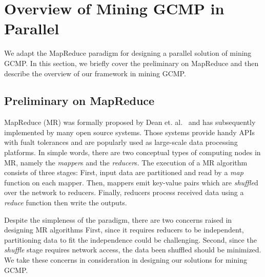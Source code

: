 \section{Overview of Mining GCMP in Parallel}
\label{sec:system_overview}
We adapt the MapReduce paradigm for designing
a parallel solution of mining GCMP. In this section,
we briefly cover the preliminary on MapReduce and then describe
the overview of our framework in mining GCMP.

\subsection{Preliminary on MapReduce}
MapReduce (MR) was formally proposed by Dean et. al.~\cite{dean2008mapreduce}
and has subsequently implemented by many open source systems. Those systems
provide handy APIs with fualt tolerances and are popularly
used as large-scale data processing platforms. 
In simple words, there are two conceptual types of computing nodes in MR,
namely the \emph{mapper}s and the \emph{reducer}s. The execution of a MR 
algorithm consists of three stages: First, input data
are partitioned and read by a \emph{map} function on each mapper. Then, mappers
emit key-value pairs which are \emph{shuffle}d over the network to reducers. Finally,
reducers process received data using a \emph{reduce} function then write the
outputs. 

Despite the simpleness of the paradigm, there are two concerns raised in designing MR algorithms
First, since it requires reducers to be independent, partitioning  
data to fit the independence could be challenging. Second, since the \emph{shuffle}
stage requires network access, the data been shuffled should be minimized. 
We take these concerns in consideration in designing our solutions for mining GCMP.
%
%

